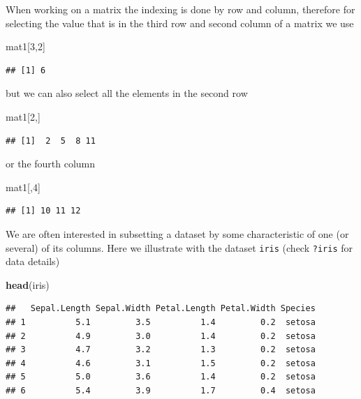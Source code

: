 \documentclass[
]{article}
\newenvironment{Shaded}{\begin{snugshade}}{\end{snugshade}}
\newcommand{\DecValTok}[1]{\textcolor[rgb]{0.00,0.00,0.81}{#1}}
\newcommand{\FunctionTok}[1]{\textcolor[rgb]{0.13,0.29,0.53}{\textbf{#1}}}
\newcommand{\NormalTok}[1]{#1}
\begin{document}
When working on a matrix the indexing is done by row and column,
therefore for selecting the value that is in the third row and second
column of a matrix we use

\begin{Shaded}
\begin{Highlighting}[]
\NormalTok{mat1[}\DecValTok{3}\NormalTok{,}\DecValTok{2}\NormalTok{]}
\end{Highlighting}
\end{Shaded}

\begin{verbatim}
## [1] 6
\end{verbatim}

\noindent but we can also select all the elements in the second row

\begin{Shaded}
\begin{Highlighting}[]
\NormalTok{mat1[}\DecValTok{2}\NormalTok{,]}
\end{Highlighting}
\end{Shaded}

\begin{verbatim}
## [1]  2  5  8 11
\end{verbatim}

or the fourth column

\begin{Shaded}
\begin{Highlighting}[]
\NormalTok{mat1[,}\DecValTok{4}\NormalTok{]}
\end{Highlighting}
\end{Shaded}

\begin{verbatim}
## [1] 10 11 12
\end{verbatim}

We are often interested in subsetting a dataset by some characteristic
of one (or several) of its columns. Here we illustrate with the dataset
\texttt{iris} (check \texttt{?iris} for data details)

\begin{Shaded}
\begin{Highlighting}[]
\FunctionTok{head}\NormalTok{(iris)}
\end{Highlighting}
\end{Shaded}

\begin{verbatim}
##   Sepal.Length Sepal.Width Petal.Length Petal.Width Species
## 1          5.1         3.5          1.4         0.2  setosa
## 2          4.9         3.0          1.4         0.2  setosa
## 3          4.7         3.2          1.3         0.2  setosa
## 4          4.6         3.1          1.5         0.2  setosa
## 5          5.0         3.6          1.4         0.2  setosa
## 6          5.4         3.9          1.7         0.4  setosa
\end{verbatim}
\end{document}
